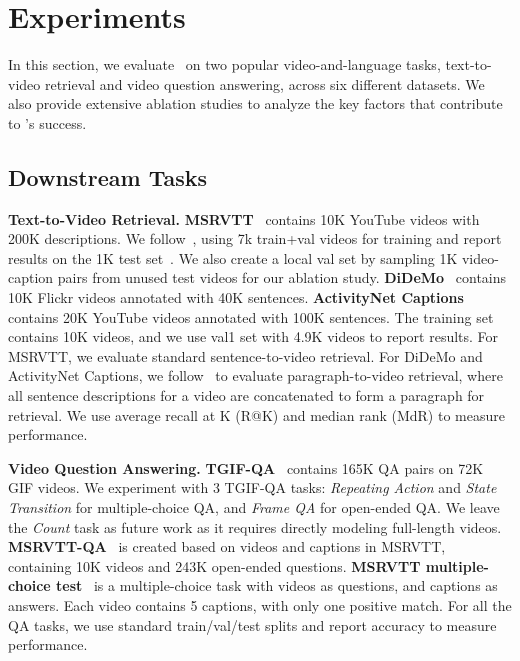 \section{Experiments}\label{sec:experiments}
In this section, we evaluate \ModelName~on two popular video-and-language tasks, text-to-video retrieval and video question answering, across six different datasets.
We also provide extensive ablation studies to analyze the key factors that contribute to \ModelName's success.


\subsection{Downstream Tasks}
\noindent\textbf{Text-to-Video Retrieval.} 
 \textbf{MSRVTT}~\cite{xu2016msr} contains 10K YouTube videos with 200K descriptions. 
We follow~\cite{yu2018joint,miech2019howto100m}, using 7k train+val videos for training and report results on the 1K test set~\cite{yu2018joint}. 
We also create a local val set by sampling 1K video-caption pairs from unused test videos for our ablation study.
 \textbf{DiDeMo}~\cite{anne2017localizing} contains 10K Flickr videos annotated with 40K sentences.
 \textbf{ActivityNet Captions}~\cite{krishna2017dense} contains 20K YouTube videos annotated with 100K sentences.
The training set contains 10K videos, and we use val1 set with 4.9K videos to report results. 
For MSRVTT, we evaluate standard sentence-to-video retrieval. For DiDeMo and ActivityNet Captions, we follow~\cite{zhang2018cross, liu2019use} to evaluate paragraph-to-video retrieval, where all sentence descriptions for a video are concatenated to form a paragraph for retrieval. We use average recall at K (R@K) and median rank (MdR) to measure performance.


\noindent\textbf{Video Question Answering.} 
 \textbf{TGIF-QA}~\cite{jang2017tgif} contains 165K QA pairs on 72K GIF videos. 
We experiment with 3 TGIF-QA tasks: \textit{Repeating Action} and \textit{State Transition} for multiple-choice QA, and \textit{Frame QA} for open-ended QA. 
We leave the \textit{Count} task as future work as it requires directly modeling full-length videos.
 \textbf{MSRVTT-QA}~\cite{xu2017video} is created based on videos and captions in MSRVTT, containing 10K videos and 243K open-ended questions. 
 \textbf{MSRVTT multiple-choice test}~\cite{yu2018joint} is a multiple-choice task with videos as questions, and captions as answers.
Each video contains 5 captions, with only one positive match.
For all the QA tasks, we use standard train/val/test splits and report accuracy to measure performance.



